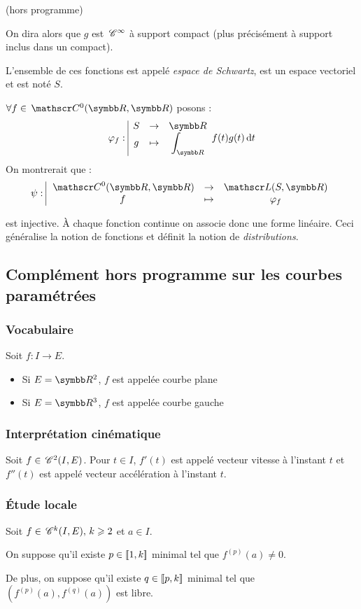 \begin{remarque}
    (hors programme)
    
    On dira alors que $g$ est $\,\mathscr C^{\infty}$ à support compact (plus précisément à support inclus dans un compact).

    L'ensemble de ces fonctions est appelé \emph{espace de Schwartz}, est un espace vectoriel et est noté $S$.

    $\forall f \in \mc 0(\R, \R)$ posons :
    \[\fonction {\varphi_f} S {\R} g {\int_{\R}} f(t)g(t) \dif t\]
    On montrerait que :
    \[\fonction {\psi} {\mc 0(\R,\R)} {\mathscr L(S,\R)} f {\varphi_f}\]

    est injective.
    À chaque fonction continue on associe donc une forme linéaire.
    Ceci généralise la notion de fonctions et définit la notion de \emph{distributions}.
\end{remarque}

\subsection{Complément hors programme sur les courbes paramétrées}

\subsubsection{Vocabulaire}
Soit $f : I \to E$.
\begin{itemize}
    \item Si $E = \R^2$, $f$ est appelée courbe plane
    \item Si $E = \R^3$, $f$ est appelée courbe gauche
\end{itemize}

\subsubsection{Interprétation cinématique}
Soit $f \in \,\mathscr C^{2}(I, E)$. 
Pour $t \in I$, $f'(t)$ est appelé vecteur vitesse à l'instant $t$ et $f''(t)$ est appelé vecteur accélération à l'instant $t$.

\subsubsection{Étude locale}
Soit $f \in \,\mathscr C^{k}(I, E), \, k \geqslant 2$ et $a \in I$. 

On suppose qu'il existe $p \in [\![1, k]\!]$ minimal tel que $f^{(p)}(a) \neq 0$.

De plus, on suppose qu'il existe $q \in [\![p, k]\!]$ minimal tel que $\left( f^{(p)}(a), f^{(q)}(a) \right)$ 
est libre.

